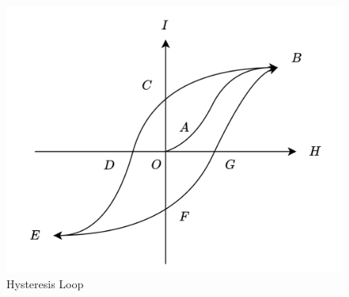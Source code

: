 \begin{figure}
    \centering
    \includegraphics[width=0.5\linewidth]{src/figures/hysteresis-loop/hysteresis-loop.png}
    \caption{Hysteresis Loop}\label{fig:hysteresis-loop}
\end{figure}

